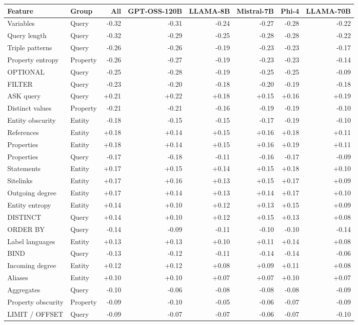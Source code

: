 \begin{tabular}{llrrrrrr}
\toprule
Feature & Group & All & GPT-OSS-120B & LLAMA-8B & Mistral-7B & Phi-4 & LLAMA-70B \\
\midrule
Variables & Query & -0.32 & -0.31 & -0.24 & -0.27 & -0.28 & -0.22 \\
Query length & Query & -0.32 & -0.29 & -0.25 & -0.28 & -0.28 & -0.22 \\
Triple patterns & Query & -0.26 & -0.26 & -0.19 & -0.23 & -0.23 & -0.17 \\
Property entropy & Property & -0.26 & -0.27 & -0.19 & -0.23 & -0.23 & -0.14 \\
OPTIONAL & Query & -0.25 & -0.28 & -0.19 & -0.25 & -0.25 & -0.09 \\
FILTER & Query & -0.23 & -0.20 & -0.18 & -0.20 & -0.19 & -0.18 \\
ASK query & Query & +0.21 & +0.22 & +0.18 & +0.15 & +0.16 & +0.19 \\
Distinct values & Property & -0.21 & -0.21 & -0.16 & -0.19 & -0.19 & -0.10 \\
Entity obscurity & Entity & -0.18 & -0.15 & -0.15 & -0.17 & -0.19 & -0.10 \\
References & Entity & +0.18 & +0.14 & +0.15 & +0.16 & +0.18 & +0.11 \\
Properties & Entity & +0.18 & +0.14 & +0.15 & +0.16 & +0.19 & +0.11 \\
Properties & Query & -0.17 & -0.18 & -0.11 & -0.16 & -0.17 & -0.09 \\
Statements & Entity & +0.17 & +0.15 & +0.14 & +0.15 & +0.18 & +0.10 \\
Sitelinks & Entity & +0.17 & +0.16 & +0.13 & +0.15 & +0.17 & +0.09 \\
Outgoing degree & Entity & +0.17 & +0.14 & +0.13 & +0.14 & +0.17 & +0.10 \\
Entity entropy & Entity & +0.14 & +0.10 & +0.12 & +0.13 & +0.15 & +0.09 \\
DISTINCT & Query & +0.14 & +0.10 & +0.12 & +0.15 & +0.13 & +0.08 \\
ORDER BY & Query & -0.14 & -0.09 & -0.11 & -0.10 & -0.10 & -0.14 \\
Label languages & Entity & +0.13 & +0.13 & +0.10 & +0.11 & +0.14 & +0.08 \\
BIND & Query & -0.13 & -0.12 & -0.11 & -0.14 & -0.14 & -0.06 \\
Incoming degree & Entity & +0.12 & +0.12 & +0.08 & +0.09 & +0.11 & +0.08 \\
Aliases & Entity & +0.10 & +0.10 & +0.07 & +0.07 & +0.10 & +0.07 \\
Aggregates & Query & -0.10 & -0.06 & -0.08 & -0.08 & -0.08 & -0.09 \\
Property obscurity & Property & -0.09 & -0.10 & -0.05 & -0.06 & -0.07 & -0.09 \\
LIMIT / OFFSET & Query & -0.09 & -0.07 & -0.07 & -0.06 & -0.07 & -0.10 \\
\bottomrule
\end{tabular}
